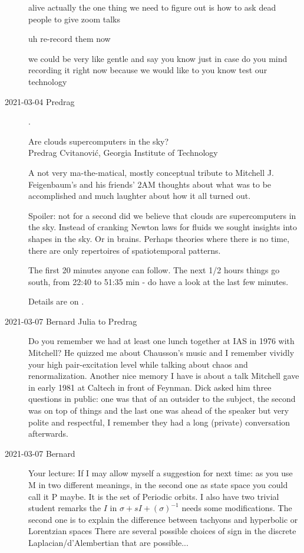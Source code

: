 \begin{description}
alive actually the one thing we need to figure out is how to ask dead people to give zoom talks

uh re-record them now

we could be very like gentle and say you know just in case do you mind recording it right now because we would like to you know test our technology

        \item[2021-03-04 Predrag].

        \item[\videoLink{YouTube.com/embed/%
oIBMTEW0Y1o}]  {\Large
Are clouds supercomputers in the sky?
         }
\\
Predrag Cvitanovi\'c, Georgia Institute of Technology

A not very ma-the-matical, mostly conceptual tribute to Mitchell J.
Feigenbaum's and his friends' 2AM thoughts about what was to be
accomplished and much laughter about how it all turned out.

Spoiler: not for a second did we believe that clouds are supercomputers
in the sky. Instead of cranking Newton laws for fluids we sought insights
into shapes in the sky. Or in brains. Perhaps theories where there is no
time, there are only repertoires of spatiotemporal patterns.

The first 20 minutes anyone can follow. The next 1/2 hours things go
south, from 22:40 to 51:35 min - do have a look at the last few minutes.

Details are on
.

\item[2021-03-07 Bernard Julia to Predrag]
Do you remember we had at least one lunch together at IAS in 1976 with
Mitchell? He quizzed me about Chausson's music and I remember vividly
your high pair-excitation level while talking about chaos and
renormalization. Another nice memory I have is about a talk Mitchell gave
in early 1981 at Caltech in front of Feynman. Dick asked him  three
questions in public: one was that of an outsider to the subject, the
second was on top of things and the last one was ahead of the speaker but
very polite and respectful, I remember they had a long (private)
conversation afterwards.

\item[2021-03-07 Bernard]
Your lecture: If I may allow myself a suggestion for next time: as you
use M in two different meanings, in the second one as state space you
could call it P maybe. It is the set of Periodic orbits.
I also have two trivial student remarks the $I$ in
$\sigma + sI +(\sigma)^{-1}$ needs some modifications.
The second one is to explain the difference between tachyons and
hyperbolic or Lorentzian spaces There are several possible choices of
sign in the discrete Laplacian/d'Alembertian that are possible...


\end{description}
